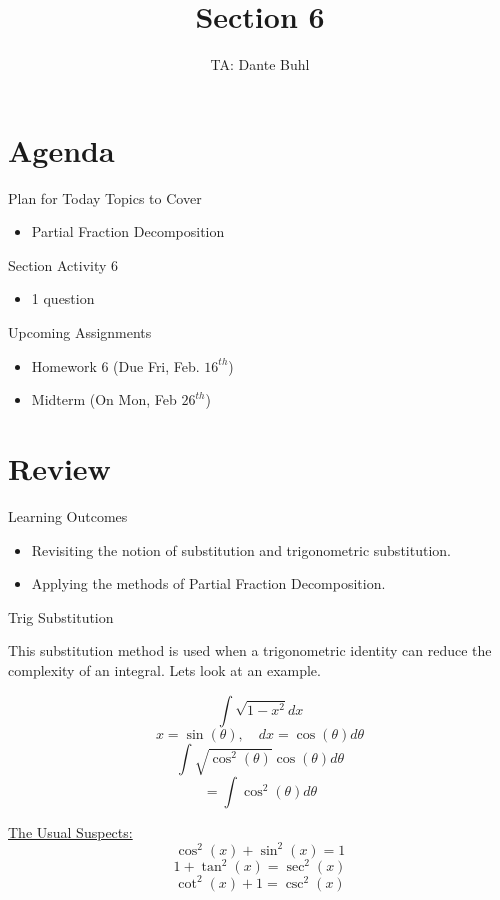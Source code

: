 \documentclass{beamer}
\title{Section 6}
\author{TA: Dante Buhl}
\institute{UCSC Math-19B}
\begin{document}
\newcommand{\bmp}[1]{\begin{minipage}{#1\textwidth}}
\newcommand{\emp}{\end{minipage}}


\frame{\titlepage}

\section{Agenda}
\begin{frame}{Plan for Today}
    Topics to Cover
    \begin{itemize}
        \item Partial Fraction Decomposition
    \end{itemize}
    Section Activity 6
    \begin{itemize}
        \item 1 question
    \end{itemize}
    Upcoming Assignments
    \begin{itemize}
        \item Homework 6 (Due Fri, Feb. $16^{th}$)
        \item Midterm (On Mon, Feb $26^{th}$)
    \end{itemize}
\end{frame}


\section{Review}
\begin{frame}{Learning Outcomes}
    \begin{itemize}
        \item Revisiting the notion of substitution and trigonometric substitution.
        \item Applying the methods of Partial Fraction Decomposition.
    \end{itemize}
\end{frame}

\begin{frame}{Trig Substitution}

This substitution method is used when a trigonometric identity can reduce the complexity of an integral. Lets look at an example. 
\bmp{.45}
\[
    \int \sqrt{1 - x^2}dx 
\]
\footnotesize
\[
    x = \sin(\theta), \quad dx = \cos(\theta)d\theta
\]
\normalsize
\[
    \int \sqrt{\cos^2(\theta)}\cos(\theta)d\theta
\]
\[
    = \int \cos^2(\theta)d\theta
\]
\emp
\bmp{.45}
\centering 
\underline{The Usual Suspects:}
\[
    \cos^2(x) + \sin^2(x) = 1
\]
\[
    1 + \tan^2(x) = \sec^2(x)   
\]
\[
    \cot^2(x) + 1 = \csc^2(x)
\]

\emp
\end{frame}
\end{document}
